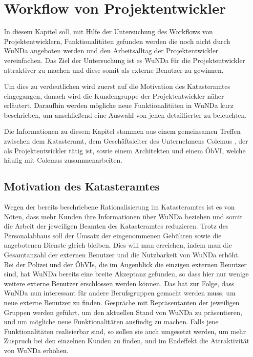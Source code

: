 \chapter{Workflow von Projektentwickler} \label{ch:aussicht}

In diesem Kapitel soll, mit Hilfe der Untersuchung des Workflows von Projektentwicklern, Funktionalitäten gefunden werden die noch nicht durch \ac{WuNDa} angeboten werden und den Arbeitsalltag der Projektentwickler vereinfachen.
Das Ziel der Untersuchung ist es \ac{WuNDa} für die Projektentwickler attraktiver zu machen und diese somit als externe Benutzer zu gewinnen. 

Um dies zu verdeutlichen wird zuerst auf die Motivation des Katasteramtes eingegangen, danach wird die Kundengruppe der Projektentwickler näher erläutert.
Daraufhin werden mögliche neue Funktionalitäten in \ac{WuNDa} kurz beschrieben, um anschließend eine Auswahl von jenen detaillierter zu beleuchten.

Die Informationen zu diesem Kapitel stammen aus einem gemeinsamen Treffen zwischen dem Katasteramt, dem Geschäftsleiter des Unternehmens Colemus \autocite{colemus}, der als Projektentwickler tätig ist, sowie einem Architekten und einem \ac{ÖbVI}, welche häufig mit Colemus zusammenarbeiten.

\section{Motivation des Katasteramtes}

Wegen der bereits beschriebene Rationalisierung im Katasteramtes ist es von Nöten, dass mehr Kunden ihre Informationen über \ac{WuNDa} beziehen und somit die Arbeit der jeweiligen Beamten des Katasteramtes reduzieren.
Trotz des Personalabbaus soll der Umsatz der eingenommenen Gebühren sowie die angebotenen Dienste gleich bleiben. Dies will man erreichen, indem man die Gesamtanzahl der externen Benutzer und die Nutzbarkeit von \ac{WuNDa} erhöht.
Bei der Polizei und der \acp{ÖbVI}, die im Augenblick die einzigen externen Benutzer sind, hat \ac{WuNDa} bereits eine breite Akzeptanz gefunden, so dass hier nur wenige weitere externe Benutzer erschlossen werden können. 
Das hat zur Folge, dass \ac{WuNDa} nun interessant für andere Berufsgruppen gemacht werden muss, um neue externe Benutzer zu finden.
Gespräche mit Repräsentanten der jeweiligen Gruppen werden geführt, um den aktuellen Stand von \ac{WuNDa} zu präsentieren, und um mögliche neue Funktionalitäten ausfindig zu machen.
Falls jene Funktionalitäten realisierbar sind, so sollen sie auch umgesetzt werden, um mehr Zuspruch bei den einzelnen Kunden zu finden, und im Endeffekt die Attraktivität von \ac{WuNDa} erhöhen.

